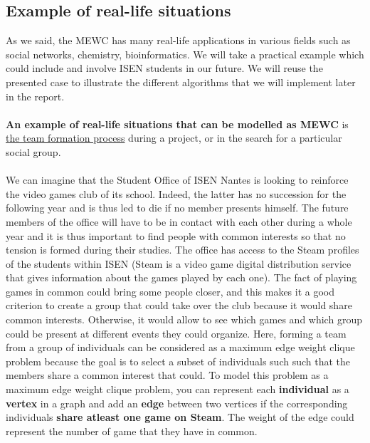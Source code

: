\documentclass{article}
\begin{document}


\subsection{Example of real-life situations}

    As we said, the MEWC has many real-life applications in various fields such as social networks, chemistry, bioinformatics. We will take a practical example which could include and involve ISEN students in our future. We will reuse the presented case to illustrate the different algorithms that we will implement later in the report.\\ \\
    \textbf{An example of real-life situations that can be modelled as MEWC} is \underline{the team formation process} during a project, or in the search for a particular social group. 
    \\ \\
    We can imagine that the Student Office of ISEN Nantes is looking to reinforce the video games club of its school. Indeed, the latter has no succession for the following year and is thus led to die if no member presents himself. The future members of the office will have to be in contact with each other during a whole year and it is thus important to find people with common interests so that no tension is formed during their studies. The office has access to the Steam profiles of the students within ISEN (Steam is a video game digital distribution service that gives information about the games played by each one). The fact of playing games in common could bring some people closer, and this makes it a good criterion to create a group that could take over the club because it would share common interests. Otherwise, it would allow to see which games and which group could be present at different events they could organize. Here, forming a team from a group of individuals can be considered as a maximum edge weight clique problem because the goal is to select a subset of individuals such such that the members share a common interest that could.
    \newpage
    To model this problem as a maximum edge weight clique problem, you can represent each \textbf{individual} as a \textbf{vertex} in a graph and add an \textbf{edge} between two vertices if the corresponding individuals \textbf{share atleast one game on Steam}. The weight of the edge could represent the number of game that they have in common.
\end{document}
